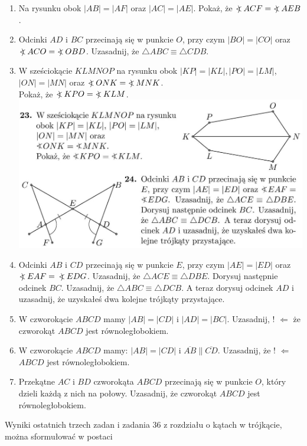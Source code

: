 \documentclass[10pt]{article}
\newcommand\Varangle{\mathop{{<\!\!\!\!\!\text{\small)}}\:}\nolimits}
\begin{document}
\begin{enumerate}
  \item Na rysunku obok \(|A B|=|A F|\) oraz \(|A C|=|A E|\). Pokaż, że \(\Varangle A C F=\Varangle A E B\).
  \item Odcinki \(A D\) i \(B C\) przecinają się w punkcie \(O\), przy czym \(|B O|=|C O|\) oraz \(\Varangle A C O=\Varangle O B D\). Uzasadnij, że \(\triangle A B C \equiv \triangle C D B\).
  \item W sześciokącie \(K L M N O P\) na rysunku obok \(|K P|=|K L|,|P O|=|L M|\), \(|O N|=|M N|\) oraz \(\Varangle O N K=\Varangle M N K\).\\
Pokaż, że \(\Varangle K P O=\Varangle K L M\).\\
\includegraphics[max width=\textwidth, center]{2024_11_21_71f62bd117d375398909g-051}
  \item Odcinki \(A B\) i \(C D\) przecinają się w punkcie \(E\), przy czym \(|A E|=|E D|\) oraz \(\Varangle E A F=\) \(\Varangle E D G\). Uzasadnij, że \(\triangle A C E \equiv \triangle D B E\). Dorysuj następnie odcinek \(B C\). Uzasadnij, że \(\triangle A B C \equiv \triangle D C B\). A teraz dorysuj odcinek \(A D\) i uzasadnij, że uzyskałeś dwa kolejne trójkąty przystające.
  \item W czworokącie \(A B C D\) mamy \(|A B|=|C D|\) i \(|A D|=|B C|\). Uzasadnij, ! \(\Leftarrow\) że czworokąt \(A B C D\) jest równoległobokiem.
  \item W czworokącie \(A B C D\) mamy: \(|A B|=|C D|\) i \(\overline{A B} \| \overline{C D}\). Uzasadnij, że ! \(\Leftarrow\) \(A B C D\) jest równoległobokiem.
  \item Przekątne \(A C\) i \(B D\) czworokąta \(A B C D\) przecinają się w punkcie \(O\), który dzieli każdą z nich na połowy. Uzasadnij, że czworokąt \(A B C D\) jest równoległobokiem.
\end{enumerate}

Wyniki ostatnich trzech zadan i zadania 36 z rozdziału o kątach w trójkącie, można sformułować w postaci
\end{document}
